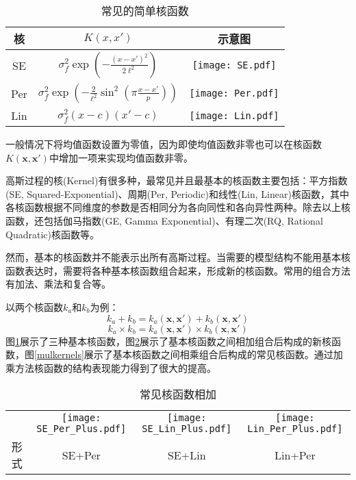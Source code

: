 \documentclass[10pt,twocolumn]{article}
\begin{document}
\begin{table}[!htbp]
\centering
\begin{tabular}{c|c|c}
\hline\hline
核 & $K(x,x')$ & 示意图 \\ \hline
SE & $\sigma_f^2 \exp\left(-\frac{(x - x')^2}{2\ell^2}\right)$ & {\texttt{[image: SE.pdf]}}  \\

Per & $\sigma_f^2 \exp\left(-\frac{2}{\ell^2} \sin^2 \left( \pi \frac{x - x'}{p} \right)\right)$ & {\texttt{[image: Per.pdf]}} \\

Lin & $\sigma_f^2 (x - c)(x' - c)$ & {\texttt{[image: Lin.pdf]}} \\
\hline\hline
\end{tabular}
\caption{常见的简单核函数}
\label{basickernels}
\end{table}

一般情况下将均值函数设置为零值，因为即使均值函数非零也可以在核函数$K(\mathbf{x},\mathbf{x}')$中增加一项来实现均值函数非零。

高斯过程的核(Kernel)有很多种，最常见并且最基本的核函数主要包括：平方指数(SE, Squared-Exponential)、周期(Per, Periodic)和线性(Lin, Linear)核函数，其中各核函数根据不同维度的参数是否相同分为各向同性和各向异性两种。除去以上核函数，还包括伽马指数(GE, Gamma Exponential)、有理二次(RQ, Rational Quadratic)核函数等。

然而，基本的核函数并不能表示出所有高斯过程。当需要的模型结构不能用基本核函数表达时，需要将各种基本核函数组合起来，形成新的核函数。常用的组合方法有加法、乘法和复合等。

以两个核函数$k_{a}$和$k_{b}$为例：
\[k_{a} + k_{b} = k_{a}(\mathbf{x},\mathbf{x}') + k_{b}(\mathbf{x},\mathbf{x}')\]
\[k_{a} \times k_{b} = k_{a}(\mathbf{x},\mathbf{x}') \times k_{b}(\mathbf{x},\mathbf{x}')\]
图\ref{basickernels}展示了三种基本核函数，图\ref{addkernels}展示了基本核函数之间相加组合后构成的新核函数，图\ref{mulkernels}展示了基本核函数之间相乘组合后构成的常见核函数。通过加乘方法核函数的结构表现能力得到了很大的提高。

\begin{table}[!htbp]
\centering
\begin{tabular}{c|ccc}
\hline\hline
\raisebox{0.5cm}{示意图}& {\texttt{[image: SE\_Per\_Plus.pdf]}}  &  {\texttt{[image: SE\_Lin\_Plus.pdf]}} &  {\texttt{[image: Lin\_Per\_Plus.pdf]}}\\
形式 & SE+Per & SE+Lin & Lin+Per\\
\hline\hline
\end{tabular}
\caption{常见核函数相加}
\label{addkernels}
\end{table}
\end{document}
